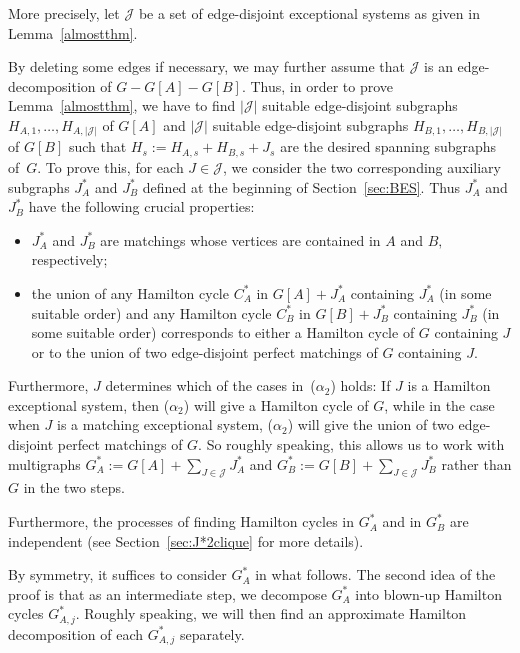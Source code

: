 \documentclass{memo-l}
\def\COMMENT#1{}
\numberwithin{section}{chapter}
\numberwithin{equation}{section}
\numberwithin{firstthm}{section}
\numberwithin{figure}{section}
\begin{document}
{More precisely, let $\mathcal{J}$ be a set of edge-disjoint exceptional systems as given in Lemma~\ref{almostthm}.%
    \COMMENT{Daniela: reworded}
By deleting some edges if necessary, we may further assume that $\mathcal{J}$ is an edge-decomposition of $G - G[A] - G[B]$.
Thus, in order to prove Lemma~\ref{almostthm}, we have to find $|\mathcal{J}|$ suitable edge-disjoint subgraphs $H_{A,1}, \dots, H_{A,|\mathcal{J}|}$
of $G[A]$ and $|\mathcal{J}|$ suitable edge-disjoint subgraphs $H_{B,1}, \dots, H_{B,|\mathcal{J}|}$ of $G[B]$ such that
$H_s := H_{A,s} + H_{B,s}  + J_s$ are the desired spanning subgraphs of~$G$.
To prove this, for each $J \in \mathcal{J}$, we consider the two corresponding  auxiliary subgraphs $J^*_A$ and $J^*_B$ defined at the beginning of Section~\ref{sec:BES}. 
Thus  $J^*_A$ and $J^*_B$ have the following crucial properties:
\begin{itemize}
\item[($\alpha_1$)] $J^*_A$ and $J^*_B$ are matchings whose vertices are contained in $A$ and $B,$\COMMENT{B\'ela: added comma} respectively;
\item[($\alpha_2$)] the union of any Hamilton cycle $C^*_A$ in $G[A] + J^*_A$ containing $J^*_A$ (in some suitable order)
and any Hamilton cycle $C^*_B$ in $G[B] + J^*_B$ containing $J^*_B$ (in some suitable order) corresponds to either a Hamilton cycle
of $G$ containing $J$ or to the union of two edge-disjoint perfect matchings of $G$ containing $J$.
\end{itemize}
Furthermore, $J$ determines which of the cases in~($\alpha_2$) holds: If $J$ is a Hamilton exceptional system,
then ($\alpha_2$) will give a Hamilton cycle of $G$, while in the case when $J$ is a matching exceptional system, ($\alpha_2$)
will give the union of two edge-disjoint perfect matchings of $G$.
So roughly speaking, this allows us to work with multigraphs $G^*_A := G[A] + \sum_{J \in \mathcal{J}} J^*_A$ and
$G^*_B:= G[B] + \sum_{J \in \mathcal{J} } J^*_B$ rather than $G$ in the two steps.%
	\COMMENT{Allan: added the word multigraphs}
Furthermore, the processes of finding Hamilton cycles in $G^*_A$ and in $G^*_B$ are independent (see Section~\ref{sec:J*2clique} for more details).%
   \COMMENT{Deryk: added brackets} 

By symmetry, it suffices to consider $G^*_A$ in what follows.
The second idea of the proof is that as an intermediate step, we decompose $G_A^*$ into blown-up Hamilton cycles
$G^*_{A,j}$. Roughly speaking, we will then find an approximate Hamilton decomposition of each $G^*_{A,j}$ separately.

}
\end{document}
